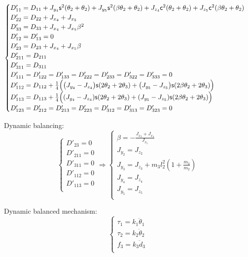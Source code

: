 \documentclass[a4paper,11pt,brazil,fleqn]{article}
\begin{document}
\begin{equation}
\begin{cases}
D'_{11} = D_{11} + J_{y_4}\mathsf{s}^2(\theta_2+\theta_2) + J_{y_5}\mathsf{s}^2(\beta\theta_2+\theta_2) + J_{z_4}\mathsf{c}^2(\theta_2+\theta_2) + J_{z_5}\mathsf{c}^2(\beta\theta_2+\theta_2) \\
D'_{22} = D_{22} + J_{x_4} + J_{x_5} \\
D'_{33} = D_{33} + J_{x_4} + J_{x_5} \beta^2\\
D'_{12} = D'_{13} = 0\\
D'_{23} = D_{23} + J_{x_4} + J_{x_5} \beta \\
D'_{211} = D_{211} \\
D'_{311} = D_{311} \\
D'_{111} = D'_{122} = D'_{133} = D'_{222} = D'_{233} = D'_{322} = D'_{333} = 0 \\
D'_{112} = D_{112} +  \frac{1}{4} \Big( \big(J_{y_4} - J_{z_4}\big)\mathsf{s}(2\theta_2+2\theta_3) + \big(J_{y_5} - J_{z_5}\big)\mathsf{s}(2\beta\theta_2+2\theta_3) \Big) \\
D'_{113} =  D_{113} + \frac{1}{4} \Big( (J_{y_4} - J_{z_4})\mathsf{s}(2\theta_2+2\theta_3) + (J_{y_5} - J_{z_5})\mathsf{s}(2\beta\theta_2+2\theta_3) \Big) \\
D'_{123} = D'_{212} = D'_{213} = D'_{223} = D'_{312} = D'_{313} = D'_{323} = 0 \\
\end{cases}
\end{equation}

Dynamic balancing:
\begin{equation}
\begin{cases}
D'_{23} = 0 \\
D'_{211} = 0 \\
D'_{311} = 0 \\
D'_{112} = 0 \\
D'_{113} = 0 \\
\end{cases}
\Rightarrow
\begin{cases}
\beta = -\frac{J_{x_3}+J_{x_4}}{J_{x_5}} \\
J_{y_2} = J_{z_2} \\
J_{y_3} = J_{z_3} + m_3 l_2^2 ( 1 + \frac{m_3}{m_2} )\\
J_{y_4} = J_{z_4} \\
J_{y_5} = J_{z_5} \\
\end{cases}
\end{equation}

Dynamic balanced mechanism:
\begin{equation}
\begin{cases}
\tau_1 = k_1 \ddot{\theta}_1 \\
\tau_2 = k_2 \ddot{\theta}_2 \\
f_3 = k_3 \ddot{d}_3 \\
\end{cases}
\end{equation}
\end{document}
